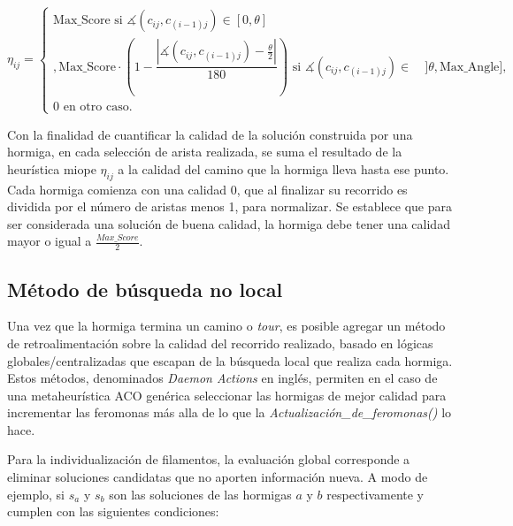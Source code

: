 
\begin{equation}
    \eta_{ij} = 
        \begin{cases} 
        \text{Max\_Score si } \measuredangle(c_{ij}, c_{(i-1)j}) \in [0, \theta]\\[3ex],
        
        \text{Max\_Score} \cdot \left(1 - \dfrac{ \left| \measuredangle(c_{ij}, c_{(i-1)j}) - \frac{\theta}{2} \right|} {180} \right)  \text{ si } \measuredangle(c_{ij}, c_{(i-1)j}) \in \quad ]\theta, \text{Max\_Angle}],\\[3ex]
        
        \text{0 en otro caso.}
        \end{cases}
    \label{eq:heuristicaMiope}
\end{equation}

Con la finalidad de cuantificar la calidad de la soluci\'on construida por una hormiga, en cada selecci\'on de arista realizada, se suma el resultado de la heur\'istica miope $\eta_{ij}$ a la calidad del camino que la hormiga lleva hasta ese punto. Cada hormiga comienza con una calidad 0, que al finalizar su recorrido es dividida por el n\'umero de aristas menos 1, para normalizar. Se establece que para ser considerada una soluci\'on de buena calidad, la hormiga debe tener una calidad mayor o igual a $\frac{Max\_Score}{2}$.
    
\subsection{M\'etodo de b\'usqueda no local}
Una vez que la hormiga termina un camino o {\it tour}, es posible agregar un m\'etodo de retroalimentaci\'on sobre la calidad del recorrido realizado, basado en l\'ogicas globales/centralizadas que escapan de la b\'usqueda local que realiza cada hormiga. Estos m\'etodos, denominados {\it Daemon Actions} en ingl\'es, permiten en el caso de una metaheur\'istica ACO gen\'erica seleccionar las hormigas de mejor calidad para incrementar las feromonas m\'as alla de lo que la {\it Actualizaci\'on\_de\_feromonas()} lo hace. 

Para la individualizaci\'on de filamentos, la evaluaci\'on global corresponde a eliminar soluciones candidatas que no aporten informaci\'on nueva. A modo de ejemplo, si $s_a$ y $s_b$ son las soluciones de las hormigas $a$ y $b$ respectivamente y cumplen con las siguientes condiciones:

